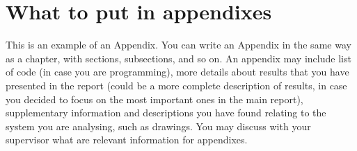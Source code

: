 \chapter{What to put in appendixes}
\label{chp:appendixb}
\begin{info}
	This is an example of an Appendix. You can write an Appendix in the same way as a chapter, with sections, subsections, and so on. An appendix may include list of code (in case you are programming), more details about results that you have presented in the report (could be a more complete  description of results, in case you decided to focus on the most important ones in the main report), supplementary information and descriptions you have found relating to the system you are analysing, such as drawings. You may discuss with your supervisor what are relevant information for appendixes.
\end{info}



